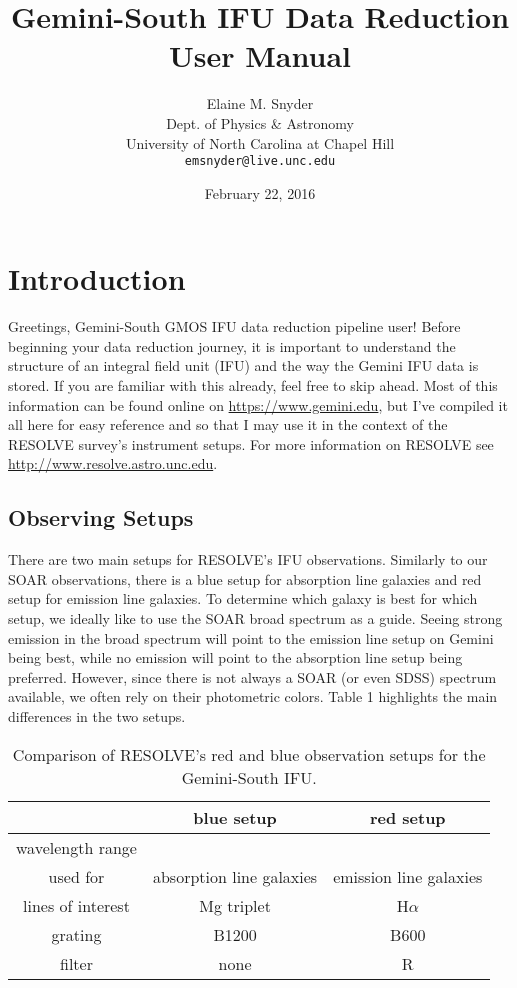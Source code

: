 \documentclass[12pt]{report}
\begin{document}
\title{Gemini-South IFU Data Reduction User Manual}
\author{Elaine M. Snyder\\
Dept. of Physics \& Astronomy\\
University of North Carolina at Chapel Hill \\
\texttt{emsnyder@live.unc.edu}}
\date{February 22, 2016}
\maketitle

\hypersetup{linkcolor=magenta}
\tableofcontents
\listoftables
\listoffigures


\chapter{Introduction}
Greetings, Gemini-South GMOS IFU data reduction pipeline user! Before beginning your data reduction journey, it is important to understand the structure of an integral field unit (IFU) and the way the Gemini IFU data is stored. If you are familiar with this already, feel free to skip ahead. Most of this information can be found online on \url{https://www.gemini.edu}, but I've compiled it all here for easy reference and so that I may use it in the context of the RESOLVE survey's instrument setups. For more information on RESOLVE see \url{http://www.resolve.astro.unc.edu}. 

\section{Observing Setups}
There are two main setups for RESOLVE's IFU observations. Similarly to our SOAR observations, there is a blue setup for absorption line galaxies and red setup for emission line galaxies. To determine which galaxy is best for which setup, we ideally like to use the SOAR broad spectrum as a guide. Seeing strong emission in the broad spectrum will point to the emission line setup on Gemini being best, while no emission will point to the absorption line setup being preferred. However, since there is not always a SOAR (or even SDSS) spectrum available, we often rely on their photometric colors. Table 1 highlights the main differences in the two setups.

\begin{table}
\centering
\begin{tabular}[b]{|c|c|c|}
  \hline
  & blue setup & red setup \\ \hline \hline
wavelength range & & \\ \hline
used for & absorption line galaxies & emission line galaxies \\ \hline
lines of interest & Mg triplet & H$\alpha$ \\ \hline
grating & B1200 & B600 \\ \hline
filter & none & R \\ \hline

\end{tabular}
\caption{Comparison of RESOLVE's red and blue observation setups for the Gemini-South IFU.}
\label{table:1}
\end{table}
\end{document}
